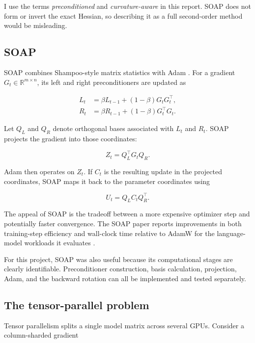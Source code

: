 \documentclass[11pt]{article}
\begin{document}
I use the terms \emph{preconditioned} and \emph{curvature-aware} in this report. SOAP does not form or invert the exact Hessian, so describing it as a full second-order method would be misleading.

\subsection{SOAP}

SOAP combines Shampoo-style matrix statistics with Adam \citep{vyas2024soap}. For a gradient
$G_t \in \mathbb{R}^{m \times n}$, its left and right preconditioners are updated as

\begin{align}
L_t &= \beta L_{t-1} + (1-\beta)G_tG_t^\top, \\
R_t &= \beta R_{t-1} + (1-\beta)G_t^\top G_t.
\end{align}

Let $Q_L$ and $Q_R$ denote orthogonal bases associated with $L_t$ and $R_t$. SOAP projects the gradient into those coordinates:

\begin{equation}
Z_t = Q_L^\top G_t Q_R.
\end{equation}

Adam then operates on $Z_t$. If $C_t$ is the resulting update in the projected coordinates, SOAP maps it back to the parameter coordinates using

\begin{equation}
U_t = Q_L C_t Q_R^\top.
\end{equation}

The appeal of SOAP is the tradeoff between a more expensive optimizer step and potentially faster convergence. The SOAP paper reports improvements in both training-step efficiency and wall-clock time relative to AdamW for the language-model workloads it evaluates \citep{vyas2024soap}.

For this project, SOAP was also useful because its computational stages are clearly identifiable. Preconditioner construction, basis calculation, projection, Adam, and the backward rotation can all be implemented and tested separately.

\subsection{The tensor-parallel problem}

Tensor parallelism splits a single model matrix across several GPUs. Consider a column-sharded gradient
\end{document}
